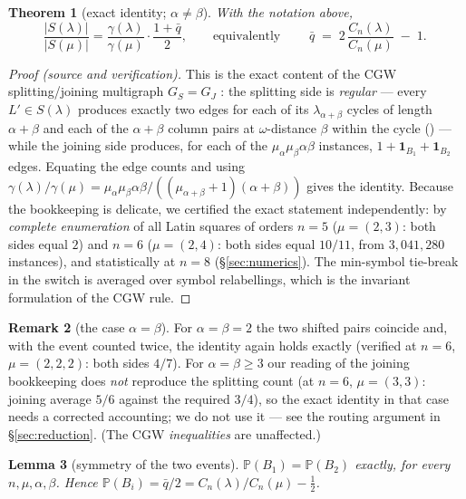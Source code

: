 \documentclass[11pt]{article}
\newtheorem{theorem}{Theorem}[section]
\newtheorem{lemma}[theorem]{Lemma}
\theoremstyle{definition}
\newtheorem{remark}[theorem]{Remark}
\renewcommand{\Pr}{\mathbb{P}}
\newcommand{\CC}{C}
\begin{document}
\begin{theorem}[exact identity; $\alpha\ne\beta$]\label{thm:identity}
With the notation above,
\[
\frac{|S(\lambda)|}{|S(\mu)|}
=\frac{\gamma(\lambda)}{\gamma(\mu)}\cdot\frac{1+\bar q}{2},
\qquad\text{equivalently}\qquad
\boxed{\;\bar q \;=\; 2\,\frac{\CC_n(\lambda)}{\CC_n(\mu)}\;-\;1.\;}
\]
\end{theorem}

\begin{proof}[Proof (source and verification)]
This is the exact content of the CGW splitting/joining multigraph
$G_S=G_J$ \cite[\S3]{CGW08}: the splitting side is \emph{regular} --- every
$L'\in S(\lambda)$ produces exactly two edges for each of its
$\lambda_{\alpha+\beta}$ cycles of length $\alpha+\beta$ and each of the
$\alpha+\beta$ column pairs at $\omega$-distance $\beta$ within the cycle
(\cite[Eq.~(2)]{CGW08}) --- while the joining side produces, for each of the
$\mu_\alpha\mu_\beta\alpha\beta$ instances, $1+\mathbf 1_{B_1}+\mathbf
1_{B_2}$ edges.  Equating the edge counts and using
$\gamma(\lambda)/\gamma(\mu)=
\mu_\alpha\mu_\beta\alpha\beta/((\mu_{\alpha+\beta}+1)(\alpha+\beta))$ gives
the identity.  Because the bookkeeping is delicate, we certified the exact
statement independently: by \emph{complete enumeration} of all Latin squares
of orders $n=5$ ($\mu=(2,3)$: both sides equal $2$) and $n=6$
($\mu=(2,4)$: both sides equal $10/11$, from $3{,}041{,}280$ instances), and
statistically at $n=8$ (\S\ref{sec:numerics}).  The min-symbol tie-break in
the switch is averaged over symbol relabellings, which is the invariant
formulation of the CGW rule.
\end{proof}

\begin{remark}[the case $\alpha=\beta$]\label{rem:albe}
For $\alpha=\beta=2$ the two shifted pairs coincide and, with the event
counted twice, the identity again holds exactly (verified at $n=6$,
$\mu=(2,2,2)$: both sides $4/7$).  For $\alpha=\beta\ge3$ our reading of the
joining bookkeeping does \emph{not} reproduce the splitting count (at $n=6$,
$\mu=(3,3)$: joining average $5/6$ against the required $3/4$), so the exact
identity in that case needs a corrected accounting; we do not use it ---
see the routing argument in \S\ref{sec:reduction}.  (The CGW
\emph{inequalities} are unaffected.)
\end{remark}

\begin{lemma}[symmetry of the two events]\label{lem:involution}
$\Pr(B_1)=\Pr(B_2)$ exactly, for every $n,\mu,\alpha,\beta$.  Hence
$\Pr(B_i)=\bar q/2 = \CC_n(\lambda)/\CC_n(\mu)-\tfrac12$.
\end{lemma}
\end{document}
